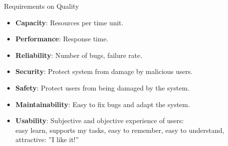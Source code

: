 \documentclass{simpleslides}
\begin{document}
\begin{frame}[fragile]{Requirements on Quality}
\begin{itemize}
\begin{itemize}
\item \textbf{Capacity}: Resources per time unit.
\item \textbf{Performance}: Response time.
\item \textbf{Reliability}: Number of bugs, failure rate.
\item \textbf{Security}: Protect system from damage by malicious users. 
\item \textbf{Safety}: Protect users from being damaged by the system.
\item \textbf{Maintainability}: Easy to fix bugs and adapt the system.
\item \textbf{Usability}: Subjective and objective experience of users:\\ easy learn, supports my tasks, easy to remember, easy to understand, attractive: ''I like it!'' 
\end{itemize}
\end{itemize}
\end{frame}
\end{document}
